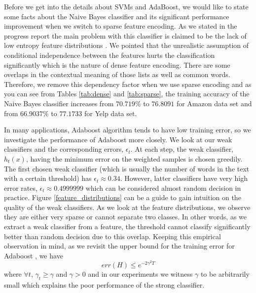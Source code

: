\documentclass[letterpaper]{article}
\begin{document}
Before we get into the details about SVMs and AdaBoost, we would like
to state some facts about the Naive Bayes classifier and its
significant performance improvement when we switch to sparse feature
encoding. As we stated in the progress report the main problem with
this classifier is claimed to be the lack of low entropy feature
distributions \cite{naivebayes}. We pointed that the unrealistic
assumption of conditional independence between the features hurts the classification
significantly which is the nature of dense feature encoding. There are
some overlaps in the contextual meaning of those lists as well as
common words. Therefore, we remove this dependency factor
when we use sparse encoding and as you can see from Tables
\ref{tab:dense} and \ref{tab:sparse}, the training accuracy of
the Naive Bayes classifier increases from $70.719\%$ to $76.8091$ for
Amazon data set and from $66.9037\%$ to $77.1733$ for Yelp data set.

In many applications, Adaboost algorithm tends to have low training error, so we
investigate the performance of Adaboost more closely. We look at our weak
classifiers and the corresponding errors, $\epsilon_t$. At each step,
the weak classifier, $h_t(x)$, having the minimum error on the weighted
samples is chosen greedily. The first chosen weak classifier (which is
usually the number of words in the text with a certain threshold) has
$\epsilon_t \approx 0.34$. However, latter classifiers have very high error rates, $\epsilon_t \approx 0.4999999$ which can
be considered almost random decision in practice. Figure
\ref{feature_distributions} can be a guide to gain intuition on the quality of the
weak classifiers. As we look at the feature distributions, we observe
they are either very sparse or cannot separate two classes. In other
words, as we extract a weak classifier from a feature, the threshold
cannot classify significantly better than random decision due to this
overlap. Keeping this empirical observation in mind, as we revisit the upper bound for the training error for Adaboost \cite{adaboost}, we have
\[
err(H) \leq e^{-2\gamma^2 T}
\]
where $\forall t$, $\gamma_t \geq \gamma $ and $\gamma > 0$ and in our
experiments we witness $\gamma$ to be arbitrarily small which explains
the poor performance of the strong classifier.
\end{document}

